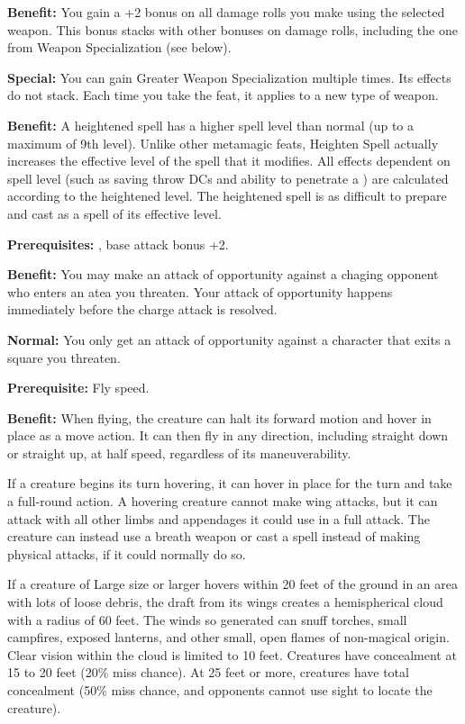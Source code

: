 \textbf{Benefit:} You gain a +2 bonus on all damage rolls you make using the selected 
weapon. This bonus stacks with other bonuses on damage rolls, including the one 
from Weapon Specialization (see below).

\textbf{Special:} You can gain Greater Weapon Specialization multiple times. Its 
effects do not stack. Each time you take the feat, it applies to a new type of 
weapon.


\textbf{Benefit:} A heightened spell has a higher spell level than normal (up to 
a maximum of 9th level). Unlike other metamagic feats, Heighten Spell actually 
increases the effective level of the spell that it modifies. All effects dependent 
on spell level (such as saving throw DCs and ability to penetrate a )
are calculated according to the heightened level. The 
heightened spell is as difficult to prepare and cast as a spell of its effective 
level.


\textbf{Prerequisites:} , base attack bonus +2.

\textbf{Benefit:} You may make an attack of opportunity against a chaging opponent 
who enters an atea you threaten.  Your attack of opportunity happens immediately 
before the charge attack is resolved.

\textbf{Normal:} You only get an attack of opportunity against a character that 
exits a square you threaten.


\textbf{Prerequisite:} Fly speed.

\textbf{Benefit:} When flying, the creature can halt its forward motion and hover 
in place as a move action. It can then fly in any direction, including straight 
down or straight up, at half speed, regardless of its maneuverability.

If a creature begins its turn hovering, it can hover in place for the turn and 
take a full-round action. A hovering creature cannot make wing attacks, but it 
can attack with all other limbs and appendages it could use in a full attack. The 
creature can instead use a breath weapon or cast a spell instead of making physical 
attacks, if it could normally do so.

If a creature of Large size or larger hovers within 20 feet of the ground in an 
area with lots of loose debris, the draft from its wings creates a hemispherical 
cloud with a radius of 60 feet. The winds so generated can snuff torches, small 
campfires, exposed lanterns, and other small, open flames of non-magical origin. 
Clear vision within the cloud is limited to 10 feet. Creatures have concealment 
at 15 to 20 feet (20\% miss chance). At 25 feet or more, creatures have total concealment 
(50\% miss chance, and opponents cannot use sight to locate the creature).

